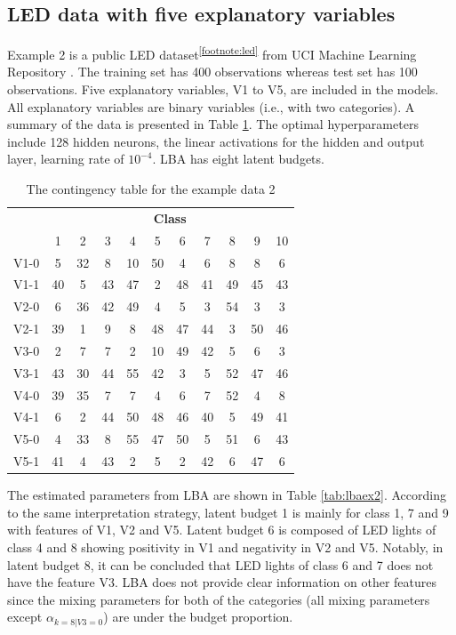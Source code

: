 \documentclass[]{interact}
\theoremstyle{plain}%
\theoremstyle{definition}
\theoremstyle{remark}
\begin{document}
\hypertarget{subsection:example2}{%
\subsection{LED data with five explanatory
variables}\label{subsection:example2}}

Example 2 is a public LED dataset\textsuperscript{\ref{footnote:led}}
from UCI Machine Learning Repository \citep{Dua2019}. The training set
has 400 observations whereas test set has 100 observations. Five
explanatory variables, V1 to V5, are included in the models. All
explanatory variables are binary variables (i.e., with two categories).
A summary of the data is presented in Table \ref{tab:tabex2}. The
optimal hyperparameters include 128 hidden neurons, the linear
activations for the hidden and output layer, learning rate of
\(10^{-4}\). LBA has eight latent budgets.

\begin{table}[H]

\caption{\label{tab:tabex2}The contingency table for the example data 2}
\centering
\begin{tabular}[t]{lcccccccccc}
\toprule
\multicolumn{1}{c}{\textbf{ }} & \multicolumn{10}{c}{\textbf{Class}} \\
\cmidrule(l{3pt}r{3pt}){2-11}
  & 1 & 2 & 3 & 4 & 5 & 6 & 7 & 8 & 9 & 10\\
\midrule
V1-0 & 5 & 32 & 8 & 10 & 50 & 4 & 6 & 8 & 8 & 6\\
V1-1 & 40 & 5 & 43 & 47 & 2 & 48 & 41 & 49 & 45 & 43\\
V2-0 & 6 & 36 & 42 & 49 & 4 & 5 & 3 & 54 & 3 & 3\\
V2-1 & 39 & 1 & 9 & 8 & 48 & 47 & 44 & 3 & 50 & 46\\
V3-0 & 2 & 7 & 7 & 2 & 10 & 49 & 42 & 5 & 6 & 3\\
\addlinespace
V3-1 & 43 & 30 & 44 & 55 & 42 & 3 & 5 & 52 & 47 & 46\\
V4-0 & 39 & 35 & 7 & 7 & 4 & 6 & 7 & 52 & 4 & 8\\
V4-1 & 6 & 2 & 44 & 50 & 48 & 46 & 40 & 5 & 49 & 41\\
V5-0 & 4 & 33 & 8 & 55 & 47 & 50 & 5 & 51 & 6 & 43\\
V5-1 & 41 & 4 & 43 & 2 & 5 & 2 & 42 & 6 & 47 & 6\\
\bottomrule
\end{tabular}
\end{table}

The estimated parameters from LBA are shown in Table \ref{tab:lbaex2}.
According to the same interpretation strategy, latent budget 1 is mainly
for class 1, 7 and 9 with features of V1, V2 and V5. Latent budget 6 is
composed of LED lights of class 4 and 8 showing positivity in V1 and
negativity in V2 and V5. Notably, in latent budget 8, it can be
concluded that LED lights of class 6 and 7 does not have the feature V3.
LBA does not provide clear information on other features since the
mixing parameters for both of the categories (all mixing parameters
except \(\alpha_{k=8|V3=0}\)) are under the budget proportion.
\end{document}
